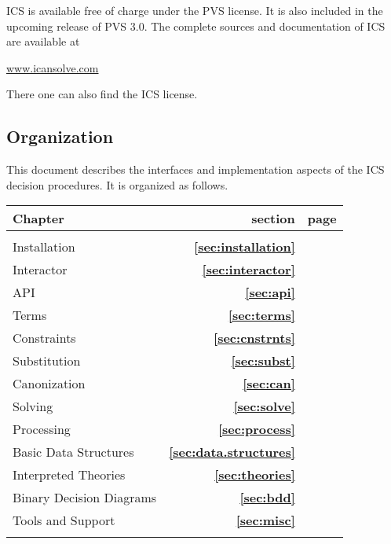 \documentclass[12pt]{article}
\newcommand{\refsec}[1]{\textbf{\ref{#1}}}
\begin{document}
ICS is available free of charge under the PVS license. It is
also included in the upcoming release of PVS 3.0\@.
The complete sources and documentation of ICS are
available at
  \begin{center}
  \url{www.icansolve.com}
  \end{center}
There one can also find the ICS license.


\subsection{Organization}

This document describes the interfaces and implementation
aspects of the ICS decision procedures. It is organized as
follows.
\begin{center}
  \begin{tabular}{p{10cm}rr}
    Chapter & section & page \\[0.5em]
    \hline\\[0.2em]
    Installation         & \refsec{sec:installation}   & \pageref{sec:installation}\\[0.5em]
    Interactor           & \refsec{sec:interactor}     & \pageref{sec:interactor} \\[0.5em]
    API                  & \refsec{sec:api}            & \pageref{sec:api}    \\[0.5em]
    Terms                & \refsec{sec:terms}          & \pageref{sec:terms}  \\[0.5em]
    Constraints          & \refsec{sec:cnstrnts}       & \pageref{sec:cnstrnts} \\[0.5em]
    Substitution         & \refsec{sec:subst}          & \pageref{sec:subst}\\[0.5em]
    Canonization         & \refsec{sec:can}            & \pageref{sec:can}\\[0.5em]
    Solving              & \refsec{sec:solve}          & \pageref{sec:solve}   \\[0.5em]
    Processing           & \refsec{sec:process}        & \pageref{sec:process}   \\[0.5em]
    Basic Data Structures& \refsec{sec:data.structures}&\pageref{sec:data.structures} \\[0.5mm]
    Interpreted Theories & \refsec{sec:theories}       & \pageref{sec:theories}   \\
    Binary Decision Diagrams   & \refsec{sec:bdd}      & \pageref{sec:bdd}\\[0.5em]
    Tools and Support    & \refsec{sec:misc}               & \pageref{sec:misc}   \\[0.5em]\\
  \end{tabular}
\end{center}
\end{document}

